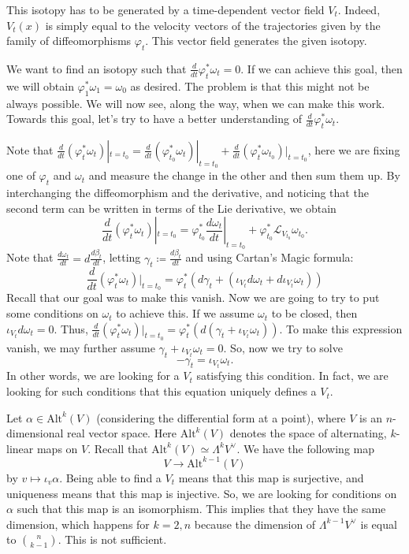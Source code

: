 \documentclass[12pt]{amsart}
\theoremstyle{remark}
\begin{document}
This isotopy has to be generated by a time-dependent vector field $V_t$. Indeed, $V_t(x)$ is simply equal to the velocity vectors of the trajectories given by the family of diffeomorphisms $\varphi_t$. This vector field generates the given isotopy. 

We want to find an isotopy such that $\frac{d}{dt}\varphi_t^*\omega_t=0$. If we can achieve this goal, then we will obtain $\varphi_1^*\omega_1=\omega_0$ as desired. The problem is that this might not be always possible. We will now see, along the way, when we can make this work. Towards this goal, let's try to have a better understanding of $\frac{d}{dt}\varphi_t^*\omega_t$.

Note that $\frac{d}{dt}(\varphi_t^*\omega_t)|_{t=t_0}=\frac{d}{dt}(\varphi_{t_0}^*\omega_t)|_{t=t_0}+\frac{d}{dt}(\varphi_t^*\omega_{t_0})|_{t=t_0}$, here we are fixing one of $\varphi_t$ and $\omega_t$ and measure the change in the other and then sum them up. By interchanging the diffeomorphism and the derivative, and noticing that the second term can be written in terms of the Lie derivative, we obtain
\begin{equation*}
\frac{d}{dt}(\varphi_t^*\omega_t)|_{t=t_0}=\varphi_{t_0}^*\frac{d\omega_t}{dt}|_{t=t_0}+\varphi_{t_0}^*\mathcal{L}_{V_{t_0}}\omega_{t_0}.
\end{equation*}
Note that $\frac{d\omega_t}{dt}=d\frac{d\beta_t}{dt}$, letting $\gamma_t\coloneqq\frac{d\beta_t}{dt}$ and using Cartan's Magic formula:
\begin{equation*}
\frac{d}{dt}(\varphi_t^*\omega_t)|_{t=t_0}=\varphi_t^*(d\gamma_t+(\iota_{V_t}d\omega_t+d\iota_{V_t}\omega_t))
\end{equation*}
Recall that our goal was to make this vanish. Now we are going to try to put some conditions on $\omega_t$ to achieve this. If we assume $\omega_t$ to be closed, then $\iota_{V_t}d\omega_t=0$. Thus, $\frac{d}{dt}(\varphi_t^*\omega_t)|_{t=t_0}=\varphi_t^*(d(\gamma_t+\iota_{V_t}\omega_t))$. To make this expression vanish, we may further assume $\gamma_t+\iota_{V_t}\omega_t=0$. So, now we try to solve $$-\gamma_t=\iota_{V_t}\omega_t.$$ In other words, we are looking for a $V_t$ satisfying this condition. In fact, we are looking for such conditions that this equation uniquely defines a $V_t$.

Let $\alpha\in \text{Alt}^k(V)$ (considering the differential form at a point), where $V$ is an $n$-dimensional real vector space. Here $\text{Alt}^k(V)$ denotes the space of alternating, $k$-linear maps on $V$. Recall that $\text{Alt}^k(V)\simeq \Lambda^k V^\vee$. We have the following map 
$$V\to \text{Alt}^{k-1}(V)$$ by $v\mapsto \iota_v\alpha$. Being able to find a $V_t$ means that this map is surjective, and uniqueness means that this map is injective. So, we are looking for conditions on $\alpha$ such that this map is an isomorphism. This implies that they have the same dimension, which happens for $k=2, n$ because the dimension of $\Lambda^{k-1} V^\vee$ is equal to $\binom{n}{k-1}$. This is not sufficient. 
\end{document}
